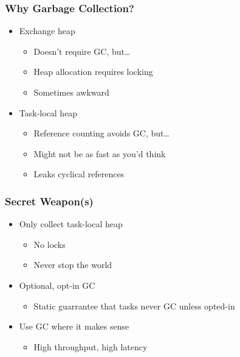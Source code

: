 \documentclass[ignorenonframetext,12pt]{beamer}
\begin{document}
\begin{frame}\frametitle{Why Garbage Collection?}
\begin{itemize}
  \item Exchange heap
  \begin{itemize}
    \item Doesn't require GC, but\ldots
    \item Heap allocation requires locking
    \item Sometimes awkward
  \end{itemize}
  \item Task-local heap
  \begin{itemize}
    \item Reference counting avoids GC, but\ldots
    \item Might not be as fast as you'd think
    \item Leaks cyclical references
  \end{itemize}
\end{itemize}
\end{frame}

\begin{frame}\frametitle{Secret Weapon(s)}
\begin{itemize}
  \item Only collect task-local heap
  \begin{itemize}
    \item No locks
    \item Never stop the world
  \end{itemize}
  \item Optional, opt-in GC
  \begin{itemize}
    \item Static guarrantee that tasks never GC unless opted-in
  \end{itemize}
  \item Use GC where it makes sense
  \begin{itemize}
    \item High throughput, high latency
  \end{itemize}
\end{itemize}
\end{frame}
\end{document}
